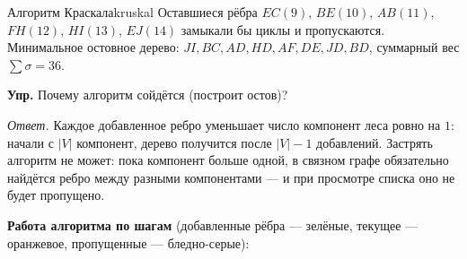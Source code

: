 \begin{algo}{Алгоритм Краскала}{kruskal}
\medskip
Оставшиеся рёбра $EC(9)$, $BE(10)$, $AB(11)$, $FH(12)$, $HI(13)$,
$EJ(14)$ замыкали бы циклы и пропускаются. Минимальное остовное дерево:
$JI, BC, AD, HD, AF, DE, JD, BD$, суммарный вес $\sum\sigma = 36$.

\medskip
\textbf{Упр.} Почему алгоритм сойдётся (построит остов)?

\textit{Ответ.} Каждое добавленное ребро уменьшает число компонент леса
ровно на $1$: начали с $|V|$ компонент, дерево получится после $|V| - 1$
добавлений. Застрять алгоритм не может: пока компонент больше одной,
в связном графе обязательно найдётся ребро между разными компонентами
--- и при просмотре списка оно не будет пропущено.

\medskip
\noindent\textbf{Работа алгоритма по шагам} (добавленные рёбра ---
зелёные, текущее --- оранжевое, пропущенные --- бледно-серые):


\end{algo}
